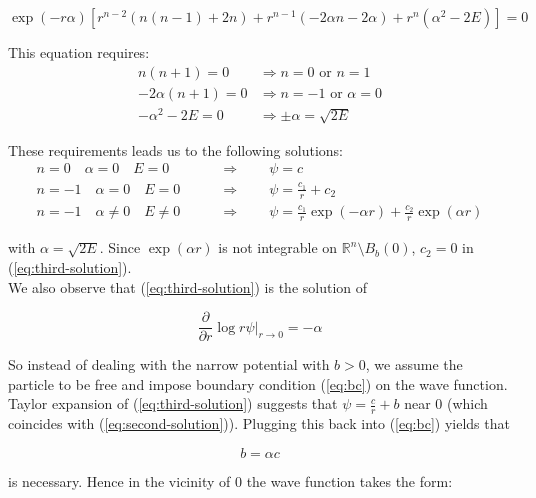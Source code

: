 \documentclass[11pt, a4paper, german]{article}
\theoremstyle{plain}
\theoremstyle{definition}
\theoremstyle{remark}
\numberwithin{equation}{section}
\numberwithin{theorem}{section}
\begin{document}
\begin{equation}
\exp(-r\alpha)\left[r^{n-2} (n(n-1) + 2n) + r^{n-1} (-2\alpha n - 2\alpha) + r^n (\alpha^2-2E)\right] = 0
\end{equation}

This equation requires:
\begin{align}
n(n+1)=0 &\Rightarrow n=0 \text{ or } n=1\\
-2\alpha(n+1) = 0 &\Rightarrow n = -1 \text{ or } \alpha = 0\\
-\alpha^2 - 2E = 0 &\Rightarrow \pm \alpha = \sqrt{2E}
\end{align}

These requirements leads us to the following solutions:
\begin{align}
n=0 \quad \alpha=0 \quad E=0 & \quad\quad \Rightarrow \quad\quad \psi= c\label{eq:first-solution}\\[5pt]
n=-1\quad \alpha=0 \quad E=0 & \quad\quad \Rightarrow \quad\quad \psi = \frac{c_1}{r} + c_2\label{eq:second-solution}\\[5pt]
n=-1\quad \alpha\neq0 \quad E \neq 0 & \quad\quad \Rightarrow \quad\quad \psi = \frac{c_1}{r} \exp(-\alpha r) + \frac{c_2}{r} \exp(\alpha r)\label{eq:third-solution}
\end{align}

with $\alpha = \sqrt{2E}$. Since $\exp(\alpha r)$ is not integrable on $\mathbb R ^n \setminus B_b(0)$, $c_2=0$ in (\ref{eq:third-solution}).\\

We also observe that (\ref{eq:third-solution}) is the solution of

\begin{equation}
\frac{\partial}{\partial r}\log r\psi | _{r\rightarrow 0} = -\alpha\label{eq:bc}
\end{equation}

So instead of dealing with the narrow potential with $b>0$, we assume the particle to be free and impose boundary condition (\ref{eq:bc}) on the wave function.\\

Taylor expansion of (\ref{eq:third-solution}) suggests that $\psi = \frac{c}{r}+b$ near 0 (which coincides with (\ref{eq:second-solution})). Plugging this back into (\ref{eq:bc}) yields that

\begin{equation}
b=\alpha c
\end{equation}

is necessary. Hence in the vicinity of 0 the wave function takes the form:
\end{document}
